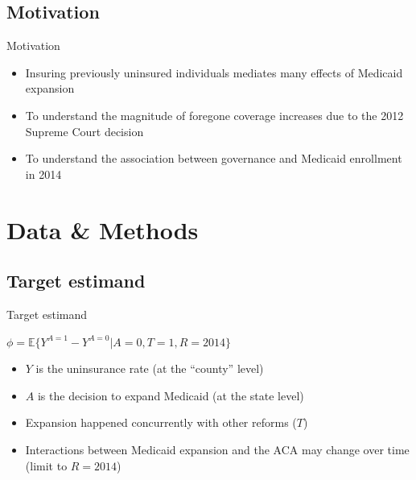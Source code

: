 \documentclass[hyperref={pdfpagelabels=false}]{beamer}
\begin{document}
\subsection{Motivation}

\begin{frame}{Motivation}

    \begin{itemize}
    
    \item Insuring previously uninsured individuals mediates many effects of Medicaid expansion \bigskip
    
    \item To understand the magnitude of foregone coverage increases due to the 2012 Supreme Court decision \bigskip
    
    \item To understand the association between governance and Medicaid enrollment in 2014 
    
    \end{itemize} 

\end{frame}

\section{Data \& Methods}

\subsection{Target estimand}

\begin{frame}{Target estimand}
\begin{center}$\phi = \mathbb{E}\{Y^{A = 1} - Y^{A = 0} | A = 0, T = 1, R = 2014\}$\end{center} \bigskip 
    \begin{itemize}
        \item $Y$ is the uninsurance rate (at the ``county'' level) \bigskip 
        \item $A$ is the decision to expand Medicaid (at the state level) \bigskip 
        \item Expansion happened concurrently with other reforms ($T$) \bigskip 
        \item Interactions between Medicaid expansion and the ACA may change over time (limit to $R = 2014$)  
    \end{itemize}
\end{frame}
\end{document}
